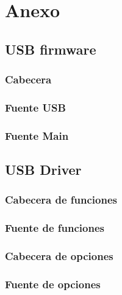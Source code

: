\chapter{Anexo}




\section{USB firmware}
\subsection{Cabecera}


\subsection{Fuente USB}


\subsection{Fuente Main}


\section{USB Driver}
\subsection{Cabecera de funciones}


\subsection{Fuente de funciones}


\subsection{Cabecera de opciones}


\subsection{Fuente de opciones}


